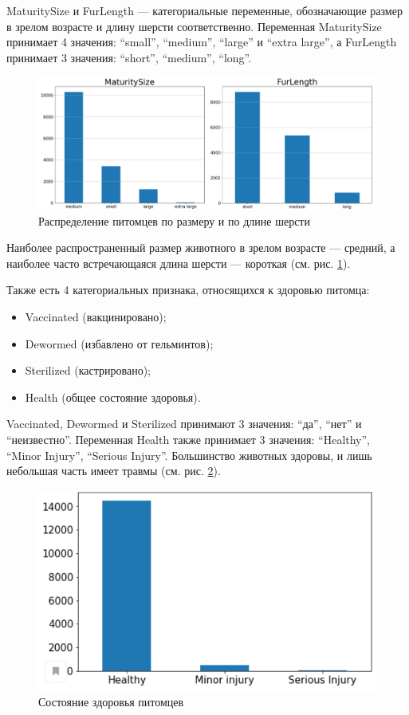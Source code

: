 \documentclass[14pt]{mmcs_article}
\begin{document}
MaturitySize и FurLength --- категориальные переменные, обозначающие размер в зрелом возрасте и длину шерсти соответственно. Переменная MaturitySize принимает 4 значения: ``small'', ``medium'', ``large'' и ``extra large'', а FurLength принимает 3 значения: ``short'', ``medium'', ``long''.

\begin{figure}[H]
	\centering
	\includegraphics[scale=0.45]{sizelength.png}
	\caption{Распределение питомцев по размеру и по длине шерсти}\label{analyse:sizelength}
\end{figure}

Наиболее распространенный размер животного в зрелом возрасте --- средний, а наиболее часто встречающаяся длина шерсти --- короткая (см. рис. \ref{analyse:sizelength}).

Также есть 4 категориальных признака, относящихся к здоровью питомца: 

\begin{itemize}
	\item Vaccinated (вакцинировано);
	\item Dewormed (избавлено от гельминтов);
	\item Sterilized (кастрировано);
	\item Health (общее состояние здоровья).
\end{itemize}

Vaccinated, Dewormed и Sterilized принимают 3 значения: ``да'', ``нет'' и ``неизвестно''. Переменная Health также принимает 3 значения: ``Healthy'', ``Minor Injury'', ``Serious Injury''. Большинство животных здоровы, и лишь небольшая часть имеет травмы (см. рис. \ref{analyse:health}).

\begin{figure}[H]
	\centering
	\includegraphics[scale=0.9]{health.png}
	\caption{Состояние здоровья питомцев}\label{analyse:health}
\end{figure}
\end{document}
